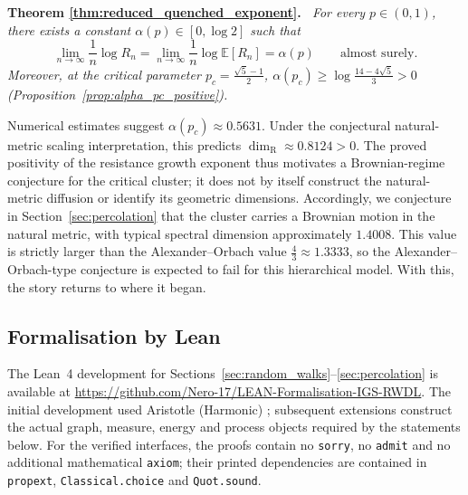 \documentclass{article}
\newenvironment{restated}[1]{%
  \par\noindent\textbf{Theorem #1.}\itshape\ }%
  {\par}
\theoremstyle{plain}
\theoremstyle{definition}
\newcommand{\dimresis}{\dim_\mathrm{R}}
\begin{document}
\begin{restated}{\ref{thm:reduced_quenched_exponent}}
For every $p\in(0,1)$, there exists a constant $\alpha(p)\in[0,\log 2]$ such that
\[
\lim_{n\to\infty}\frac1n\log R_n=\lim_{n\to\infty}\frac1n\log\mathbb E[R_n]=\alpha(p)
\qquad\text{almost surely}.
\]
Moreover, at the critical parameter $p_c=\frac{\sqrt5-1}{2}$, $\alpha(p_c)\ge\log\frac{14-4\sqrt5}{3}>0$ (Proposition~\ref{prop:alpha_pc_positive}).
\end{restated}

Numerical estimates suggest $\alpha(p_c)\approx 0.5631$. Under the conjectural natural-metric scaling interpretation, this predicts $\dimresis\approx 0.8124>0$.
The proved positivity of the resistance growth exponent thus motivates a Brownian-regime conjecture for the critical cluster; it does not by itself construct the natural-metric diffusion or identify its geometric dimensions.
Accordingly, we conjecture in Section~\ref{sec:percolation} that the cluster carries a Brownian motion in the natural metric, with typical spectral dimension approximately $1.4008$.
This value is strictly larger than the Alexander--Orbach value $\frac43\approx 1.3333$, so the Alexander--Orbach-type conjecture is expected to fail for this hierarchical model.
With this, the story returns to where it began.














\subsection{Formalisation by Lean}\label{subsec:formalisation}
The Lean~4 development for Sections~\ref{sec:random_walks}--\ref{sec:percolation} is available at \url{https://github.com/Nero-17/LEAN-Formalisation-IGS-RWDL}.
The initial development used Aristotle (Harmonic) \cite{achim2025aristotle}; subsequent extensions construct the actual graph, measure, energy and process objects required by the statements below.
For the verified interfaces, the proofs contain no \texttt{sorry}, no \texttt{admit} and no additional mathematical \texttt{axiom}; their printed dependencies are contained in \texttt{propext}, \texttt{Classical.choice} and \texttt{Quot.sound}.
\end{document}
